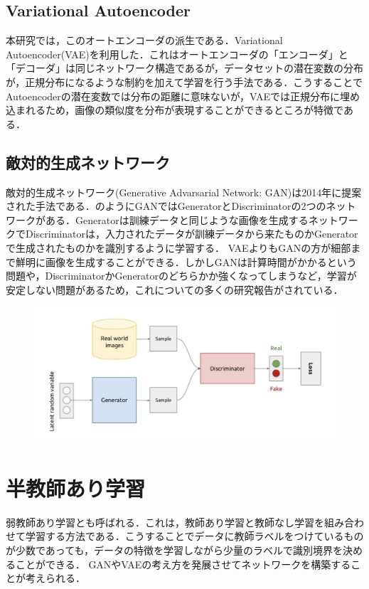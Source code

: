 \subsection{Variational Autoencoder}
本研究では，このオートエンコーダの派生である．Variational Autoencoder(VAE)を利用した．これはオートエンコーダの「エンコーダ」と「デコーダ」は同じネットワーク構造であるが，データセットの潜在変数の分布が，正規分布になるような制約を加えて学習を行う手法である．こうすることでAutoencoderの潜在変数では分布の距離に意味ないが，VAEでは正規分布に埋め込まれるため，画像の類似度を分布が表現することができるところが特徴である．

\subsection{敵対的生成ネットワーク}
敵対的生成ネットワーク(Generative Advarsarial Network: GAN)は2014年に提案された手法である．のようにGANではGeneratorとDiscriminatorの2つのネットワークがある．Generatorは訓練データと同じような画像を生成するネットワークでDiscriminatorは，入力されたデータが訓練データから来たものかGeneratorで生成されたものかを識別するように学習する．
VAEよりもGANの方が細部まで鮮明に画像を生成することができる．しかしGANは計算時間がかかるという問題や，DiscriminatorかGeneratorのどちらかか強くなってしまうなど，学習が安定しない問題があるため，これについての多くの研究報告がされている．

\begin{figure}[h]
\centering
\includegraphics[width=0.7\linewidth]{fig/generative_adversarial_nets.png}
\caption{}
\label{fig:GAN}
\end{figure}

\section{半教師あり学習}
弱教師あり学習とも呼ばれる．これは，教師あり学習と教師なし学習を組み合わせて学習する方法である．こうすることでデータに教師ラベルをつけているものが少数であっても，データの特徴を学習しながら少量のラベルで識別境界を決めることができる．
GANやVAEの考え方を発展させてネットワークを構築することが考えられる．

